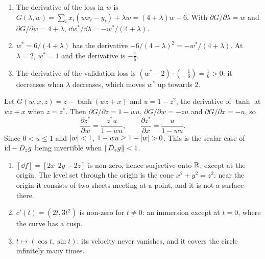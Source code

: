 \begin{enumerate}[nosep]
  \item The derivative of the loss in $w$ is
        $G(\lambda, w) = \sum_ix_i(wx_i - y_i) + \lambda w
        = (4 + \lambda)w - 6$. With $\partial G/\partial\lambda = w$ and
        $\partial G/\partial w = 4 + \lambda$,
        $\dd w^*/\dd\lambda = -w^*/(4 + \lambda)$.
  \item $w^* = 6/(4 + \lambda)$ has the derivative
        $-6/(4 + \lambda)^2 = -w^*/(4 + \lambda)$. At $\lambda = 2$,
        $w^* = 1$ and the derivative is $-\frac16$.
  \item The derivative of the validation loss is
        $(w^* - 2)\cdot(-\frac16) = \frac16 > 0$: it decreases when
        $\lambda$ decreases, which moves $w^*$ up towards $2$.
\end{enumerate}

Let $G(w, x, z) = z - \tanh(wz + x)$ and $u = 1 - z^2$, the derivative
of $\tanh$ at $wz + x$ when $z = z^*$. Then
$\partial G/\partial z = 1 - wu$, $\partial G/\partial w = -zu$ and
$\partial G/\partial x = -u$, so
\[
  \frac{\partial z^*}{\partial w} = \frac{z^*u}{1 - wu},
  \qquad
  \frac{\partial z^*}{\partial x} = \frac u{1 - wu} .
\]
Since $0 < u\leq1$ and $\left|w\right| < 1$, $1 - wu\geq1 - \left|w\right| > 0$. This is
the scalar case of $\mathrm{id} - D_zg$ being invertible when
$\left\|D_zg\right\| < 1$.

\begin{enumerate}[nosep]
  \item $[\dd f] = [2x\ \ 2y\ \ {-2z}]$ is non-zero, hence surjective
        onto $\mathbb{R}$, except at the origin. The level set through the origin
        is the cone $x^2 + y^2 = z^2$: near the origin it consists of two
        sheets meeting at a point, and it is not a surface there.
  \item $c'(t) = (2t, 3t^2)$ is non-zero for $t\neq0$: an immersion
        except at $t = 0$, where the curve has a cusp.
  \item $t\mapsto(\cos t, \sin t)$: its velocity never vanishes, and it
        covers the circle infinitely many times.
\end{enumerate}


